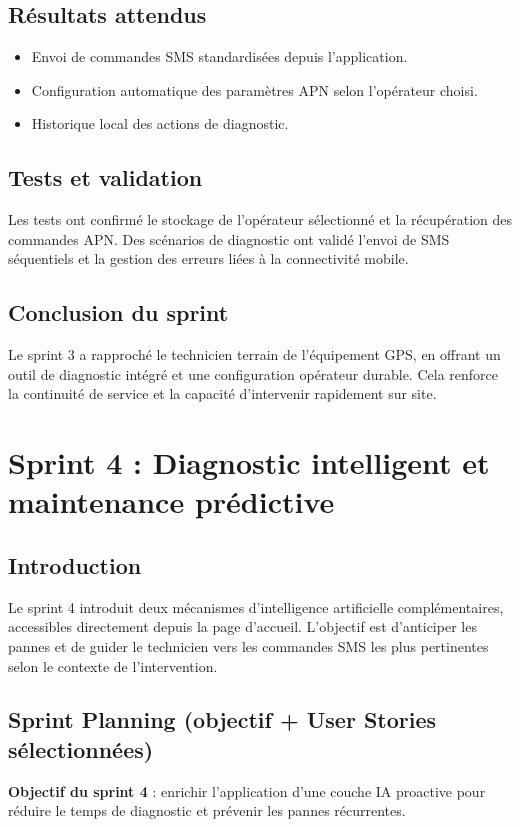 \documentclass[12pt,a4paper]{report}
\begin{document}
\section{Résultats attendus}
\begin{itemize}
    \item Envoi de commandes SMS standardisées depuis l'application.
    \item Configuration automatique des paramètres APN selon l'opérateur choisi.
    \item Historique local des actions de diagnostic.
\end{itemize}

\section{Tests et validation}
\noindent Les tests ont confirmé le stockage de l'opérateur sélectionné et la récupération des commandes APN. Des scénarios de diagnostic ont validé l'envoi de SMS séquentiels et la gestion des erreurs liées à la connectivité mobile.

\section{Conclusion du sprint}
\noindent Le sprint 3 a rapproché le technicien terrain de l'équipement GPS, en offrant un outil de diagnostic intégré et une configuration opérateur durable. Cela renforce la continuité de service et la capacité d'intervenir rapidement sur site.

\chapter{Sprint 4 : Diagnostic intelligent et maintenance prédictive}

\section{Introduction}
\noindent Le sprint 4 introduit deux mécanismes d'intelligence artificielle complémentaires, accessibles directement depuis la page d'accueil. L'objectif est d'anticiper les pannes et de guider le technicien vers les commandes SMS les plus pertinentes selon le contexte de l'intervention.

\section{Sprint Planning (objectif + User Stories sélectionnées)}
\noindent \textbf{Objectif du sprint 4} : enrichir l'application d'une couche IA proactive pour réduire le temps de diagnostic et prévenir les pannes récurrentes.
\end{document}
